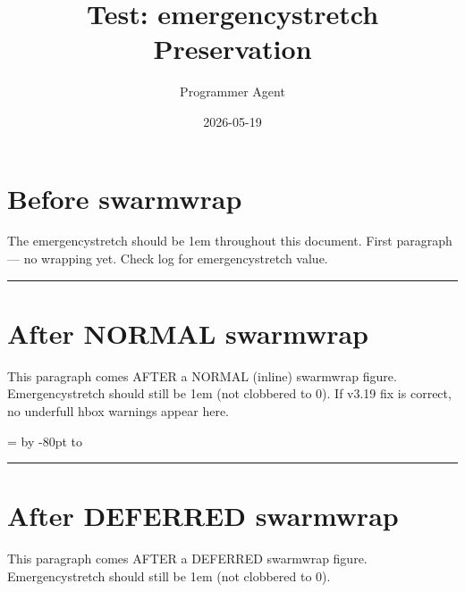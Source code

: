 \documentclass[a4paper,11pt]{article}
\title{Test: emergencystretch Preservation}
\author{Programmer Agent}
\date{2026-05-19}
\begin{document}
\maketitle

\section*{Before swarmwrap}
The emergencystretch should be 1em throughout this document.
First paragraph — no wrapping yet. Check log for emergencystretch value.

\begin{swarmwrap}%
  \begin{minipage}[t]{3cm}
    \centering
    \rule{\linewidth}{3cm}
  \end{minipage}%
\end{swarmwrap}%
\swarmwrapnext
\lipsum[1]

\section*{After NORMAL swarmwrap}
This paragraph comes AFTER a NORMAL (inline) swarmwrap figure.
Emergencystretch should still be 1em (not clobbered to 0).
If v3.19 fix is correct, no underfull hbox warnings appear here.

\newpage

\newdimen\swtestht
\swtestht=\textheight
\advance\swtestht by -80pt
\vbox to\swtestht{%
  \lipsum[1-3]%
  \vss
}%

\begin{swarmwrap}%
  \begin{minipage}[t]{3cm}
    \centering
    \rule{\linewidth}{3cm}
  \end{minipage}%
\end{swarmwrap}%
\swarmwrapnext
\lipsum[1]

\newpage

\section*{After DEFERRED swarmwrap}
This paragraph comes AFTER a DEFERRED swarmwrap figure.
Emergencystretch should still be 1em (not clobbered to 0).

\lipsum[2]
\end{document}
